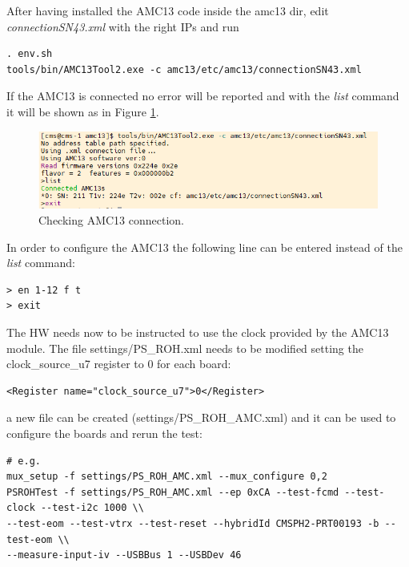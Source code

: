 \documentclass[10pt,a4paper]{article}
\begin{document}
After having installed the AMC13 code inside the amc13 dir, edit {\it connectionSN43.xml} with the right IPs and run 
\begin{framed}
\begin{verbatim}
. env.sh
tools/bin/AMC13Tool2.exe -c amc13/etc/amc13/connectionSN43.xml
\end{verbatim}
\end{framed}
If the AMC13 is connected no error will be reported and with the {\it list} command it will be shown as in Figure \ref{amc13connected}.
\begin{figure}[h!]
\centering
 \includegraphics[width=\linewidth]{amc13connected.png} 
  \caption{Checking AMC13 connection.}
\label{amc13connected}
\end{figure}
In order to configure the AMC13 the following line can be entered instead of the {\it list} command:
\begin{framed}
\begin{verbatim}
> en 1-12 f t
> exit
\end{verbatim}
\end{framed}

The HW needs now to be instructed to use the clock provided by the AMC13 module. The file settings/PS\_ROH.xml needs to be modified setting the clock\_source\_u7 register to 0 for each board:
\begin{framed}
\begin{verbatim}
<Register name="clock_source_u7">0</Register>
\end{verbatim}
\end{framed}
a new file can be created (settings/PS\_ROH\_AMC.xml) and it can be used to configure the boards and rerun the test:
\begin{framed}
\begin{verbatim}
# e.g.
mux_setup -f settings/PS_ROH_AMC.xml --mux_configure 0,2
PSROHTest -f settings/PS_ROH_AMC.xml --ep 0xCA --test-fcmd --test-clock --test-i2c 1000 \\ 
--test-eom --test-vtrx --test-reset --hybridId CMSPH2-PRT00193 -b --test-eom \\
--measure-input-iv --USBBus 1 --USBDev 46
\end{verbatim}
\end{framed}
\end{document}
